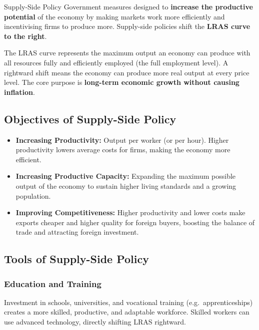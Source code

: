 \documentclass[11pt, a4paper, twoside]{book}
\begin{document}
\begin{keyterm}{Supply-Side Policy}
Government measures designed to \textbf{increase the productive potential} of the economy by making markets work more efficiently and incentivising firms to produce more. Supply-side policies shift the \textbf{LRAS curve to the right}.
\end{keyterm}

\begin{coreidea}
The LRAS curve represents the maximum output an economy can produce with all resources fully and efficiently employed (the full employment level). A rightward shift means the economy can produce more real output at every price level. The core purpose is \textbf{long-term economic growth without causing inflation}.
\end{coreidea}

\subsection{Objectives of Supply-Side Policy}

\begin{itemize}
  \item \textbf{Increasing Productivity:} Output per worker (or per hour). Higher productivity lowers average costs for firms, making the economy more efficient.
  \item \textbf{Increasing Productive Capacity:} Expanding the maximum possible output of the economy to sustain higher living standards and a growing population.
  \item \textbf{Improving Competitiveness:} Higher productivity and lower costs make exports cheaper and higher quality for foreign buyers, boosting the balance of trade and attracting foreign investment.
\end{itemize}

\subsection{Tools of Supply-Side Policy}

\subsubsection{Education and Training}

Investment in schools, universities, and vocational training (e.g.\ apprenticeships) creates a more skilled, productive, and adaptable workforce. Skilled workers can use advanced technology, directly shifting LRAS rightward.
\end{document}
